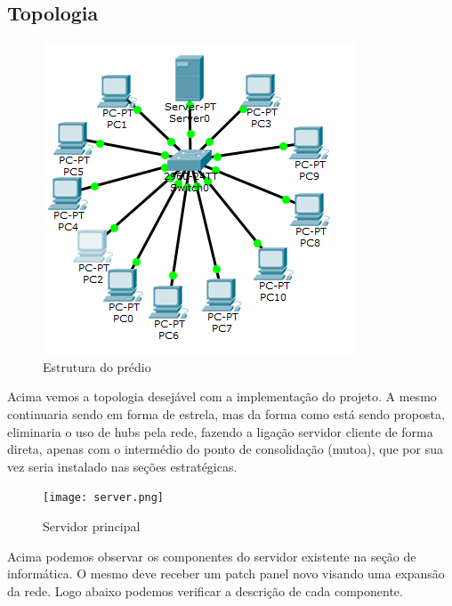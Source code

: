 \documentclass[12pt, a4paper]{article}
\begin{document}
	\subsection{Topologia}
	\FloatBarrier
	\begin{figure}[!htp]
		\centering
		\includegraphics[scale=0.9]{newdiagram.png}
		\caption{Estrutura do prédio}
	\end{figure}
	\FloatBarrier
	Acima vemos a topologia desejável com a implementação do projeto. A mesmo continuaria sendo em forma de estrela, mas da forma como está sendo proposta, eliminaria o uso de hubs pela rede, fazendo a ligação servidor cliente de forma direta, apenas com o intermédio do ponto de consolidação (mutoa), que por sua vez seria instalado nas seções estratégicas.
	\FloatBarrier
	\begin{figure}[!htp]
		\centering
		\texttt{[image: server.png]}
		\caption{Servidor principal}
	\end{figure}
	\FloatBarrier
	Acima podemos observar os componentes  do servidor existente na seção de informática. O mesmo deve receber um patch panel novo visando uma expansão da rede. Logo abaixo podemos verificar a descrição de cada componente.
	\FloatBarrier
	
	\FloatBarrier
	
\end{document}
